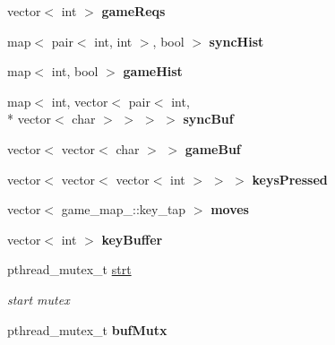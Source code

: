 \begin{DoxyCompactItemize}
\item 
\hypertarget{class_network_a55d5112107f84aceb32d6a9e63de64ba}{vector$<$ int $>$ {\bfseries game\+Reqs}}\label{class_network_a55d5112107f84aceb32d6a9e63de64ba}

\item 
\hypertarget{class_network_a5bdd26ac50a42785988c242a2346d5ff}{map$<$ pair$<$ int, int $>$, bool $>$ {\bfseries sync\+Hist}}\label{class_network_a5bdd26ac50a42785988c242a2346d5ff}

\item 
\hypertarget{class_network_a18fa1b436ab9b2bbb848dd03a106692d}{map$<$ int, bool $>$ {\bfseries game\+Hist}}\label{class_network_a18fa1b436ab9b2bbb848dd03a106692d}

\item 
\hypertarget{class_network_a95f9cfacd6ed1bfac90aa57c03a59e8f}{map$<$ int, vector$<$ pair$<$ int, \\*
vector$<$ char $>$ $>$ $>$ $>$ {\bfseries sync\+Buf}}\label{class_network_a95f9cfacd6ed1bfac90aa57c03a59e8f}

\item 
\hypertarget{class_network_a517c659b733198e47674da145075be5f}{vector$<$ vector$<$ char $>$ $>$ {\bfseries game\+Buf}}\label{class_network_a517c659b733198e47674da145075be5f}

\item 
\hypertarget{class_network_ae68f0b3a85704d988c466d9b99f6ded0}{vector$<$ vector$<$ vector$<$ int $>$ $>$ $>$ {\bfseries keys\+Pressed}}\label{class_network_ae68f0b3a85704d988c466d9b99f6ded0}

\item 
\hypertarget{class_network_a5a36bbfb790cfab740a403a5994daaa2}{vector$<$ game\+\_\+map\+\_\+\+::key\+\_\+tap $>$ {\bfseries moves}}\label{class_network_a5a36bbfb790cfab740a403a5994daaa2}

\item 
\hypertarget{class_network_a0697389697ba88967ed62090bd677eff}{vector$<$ int $>$ {\bfseries key\+Buffer}}\label{class_network_a0697389697ba88967ed62090bd677eff}

\item 
\hypertarget{class_network_ab107edaf8614555e72aa478ef6fc014d}{pthread\+\_\+mutex\+\_\+t \hyperlink{class_network_ab107edaf8614555e72aa478ef6fc014d}{strt}}\label{class_network_ab107edaf8614555e72aa478ef6fc014d}

\begin{DoxyCompactList}\small\item\em start mutex \end{DoxyCompactList}\item 
\hypertarget{class_network_add0146fc5de940a69c6d18022b3de659}{pthread\+\_\+mutex\+\_\+t {\bfseries buf\+Mutx}}\label{class_network_add0146fc5de940a69c6d18022b3de659}


\end{DoxyCompactItemize}
